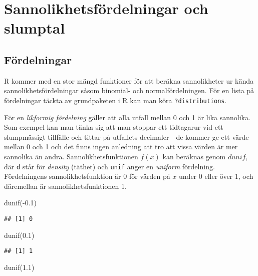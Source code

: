 \documentclass[
]{book}
\newenvironment{Shaded}{\begin{snugshade}}{\end{snugshade}}
\newcommand{\FloatTok}[1]{\textcolor[rgb]{0.00,0.00,0.81}{#1}}
\newcommand{\FunctionTok}[1]{\textcolor[rgb]{0.00,0.00,0.00}{#1}}
\newcommand{\NormalTok}[1]{#1}
\newcommand{\SpecialCharTok}[1]{\textcolor[rgb]{0.00,0.00,0.00}{#1}}
\theoremstyle{definition}
\theoremstyle{definition}
\theoremstyle{definition}
\theoremstyle{definition}
\theoremstyle{remark}
\begin{document}
\hypertarget{sannolikhetsfuxf6rdelningar-och-slumptal}{%
\chapter{Sannolikhetsfördelningar och slumptal}\label{sannolikhetsfuxf6rdelningar-och-slumptal}}

\hypertarget{fuxf6rdelningar}{%
\section{Fördelningar}\label{fuxf6rdelningar}}

R kommer med en stor mängd funktioner för att beräkna sannolikheter ur kända sannolikhetsfördelningar såsom binomial- och normalfördelningen. För en lista på fördelningar täckta av grundpaketen i R kan man köra \texttt{?distributions}.

För en \emph{likformig fördelning} gäller att alla utfall mellan 0 och 1 är lika sannolika. Som exempel kan man tänka sig att man stoppar ett tidtagarur vid ett slumpmässigt tillfälle och tittar på utfallets decimaler - de kommer ge ett värde mellan 0 och 1 och det finns ingen anledning att tro att vissa värden är mer sannolika än andra. Sannolikhetsfunktionen \(f(x)\) kan beräknas genom \(dunif\), där \texttt{d} står för \emph{density} (täthet) och \texttt{unif} anger en \emph{uniform} fördelning. Fördelningens sannolikhetsfunktion är 0 för värden på \(x\) under 0 eller över 1, och däremellan är sannolikhetsfunktionen 1.

\begin{Shaded}
\begin{Highlighting}[]
\FunctionTok{dunif}\NormalTok{(}\SpecialCharTok{{-}}\FloatTok{0.1}\NormalTok{)}
\end{Highlighting}
\end{Shaded}

\begin{verbatim}
## [1] 0
\end{verbatim}

\begin{Shaded}
\begin{Highlighting}[]
\FunctionTok{dunif}\NormalTok{(}\FloatTok{0.1}\NormalTok{)}
\end{Highlighting}
\end{Shaded}

\begin{verbatim}
## [1] 1
\end{verbatim}

\begin{Shaded}
\begin{Highlighting}[]
\FunctionTok{dunif}\NormalTok{(}\FloatTok{1.1}\NormalTok{)}
\end{Highlighting}
\end{Shaded}
\end{document}
